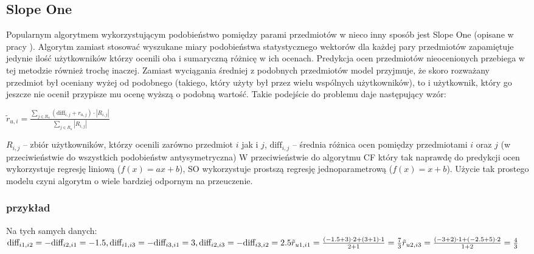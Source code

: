 \documentclass{pracamgr}
\begin{document}
   \subsection{Slope One}
    Popularnym algorytmem wykorzystującym podobieństwo pomiędzy parami przedmiotów w nieco inny sposób jest Slope One (opisane w pracy \cite{SO}).
    Algorytm zamiast stosować wyszukane miary podobieństwa statystycznego wektorów dla każdej pary przedmiotów zapamiętuje jedynie ilość
    użytkowników którzy ocenili oba i sumaryczną różnicę w ich ocenach.\newline
    Predykcja ocen przedmiotów nieocenionych przebiega w tej metodzie również trochę inaczej.
    Zamiast wyciągania średniej z podobnych przedmiotów model przyjmuje,
    że skoro rozważany przedmiot był oceniany wyżej od podobnego (takiego, który użyty był przez wielu wspólnych użytkowników),
    to i użytkownik, który go jeszcze nie ocenił przypisze mu ocenę wyższą o podobną wartość.
    Takie podejście do problemu daje następujący wzór:\newline
    \begin{center}
     $\tilde{r}_{u,i}=\frac{\sum\limits_{j\in R_u}(\text{diff}_{i,j}+r_{u,j})\cdot|R_{i,j}|}{\sum\limits_{j\in R_u}|R_{i,j}|}$
    \end{center}
    {\scriptsize
     $R_{i,j}$ -- zbiór użytkowników, którzy ocenili zarówno przedmiot $i$ jak i $j$,\newline
     $\text{diff}_{i,j}$ -- średnia różnica ocen pomiędzy przedmiotami $i$ oraz $j$ (w przeciwieństwie do wszystkich podobieństw antysymetryczna)
    }\newline
    W przeciwieństwie do algorytmu CF który tak naprawdę do predykcji ocen wykorzystuje regresję liniową ($f(x)=ax+b$),
    SO wykorzystuje prostszą regresję jednoparametrową ($f(x)=x+b$). Użycie tak prostego modelu czyni algorytm o wiele bardziej odpornym na przeuczenie.
    \subsubsection{przykład}
     Na tych samych danych:\newline
     $\text{diff}_{i1,i2}=-\text{diff}_{i2,i1}=-1.5,\text{diff}_{i1,i3}=-\text{diff}_{i3,i1}=3,
     \text{diff}_{i2,i3}=-\text{diff}_{i3,i2}=2.5\newline
     \tilde{r}_{u1,i1}=\frac{(-1.5+3)\cdot2+(3+1)\cdot1}{2+1}=\frac{7}{3}\newline
     \tilde{r}_{u2,i3}=\frac{(-3+2)\cdot1+(-2.5+5)\cdot2}{1+2}=\frac{4}{3}
     $
\end{document}
